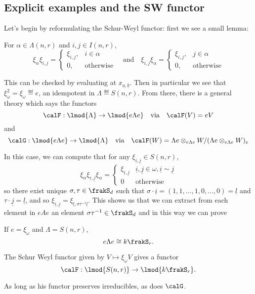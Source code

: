 \documentclass[12pt]{article}
\begin{document}
	\subsection{Explicit examples and the SW functor}
	Let's begin by reformulating the Schur-Weyl functor: first we see a small lemma:
	\begin{lem}
		For $\alpha\in\Lambda(n,r)$ and $i,j\in I(n,r)$,
		\[\xi_\alpha\xi_{i,j}=\begin{cases}
			\xi_{i,j}, & i\in\alpha\\
			0, &\text{otherwise}
		\end{cases}\quad\text{and}\quad\xi_{i,j}\xi_\alpha=\begin{cases}
			\xi_{i,j}, & j\in\alpha\\
			0, &\text{otherwise}
		\end{cases}\]
	\end{lem}
	This can be checked by evaluating at $x_{\underline a,\underline b}$. Then in particular we see that $\xi_\omega^2=\xi_\omega\eqdef e$,
	an idempotent in $\Lambda\eqdef S(n,r)$. From there, there is a general theory which says the functors 
	\[\calF:\lmod{\Lambda}\to \lmod{e\Lambda e}\quad\text{via}\quad \calF(V)=eV\]
	and 
	\[\calG:\lmod{e\Lambda e}\to \lmod{\Lambda}\quad\text{via}\quad \calF(W)=\Lambda e\otimes_{e\Lambda e}W/(\Lambda e\otimes_{e\Lambda e}W)_e\]

	In this case, we can compute that for any $\xi_{\underline i,\underline j}\in S(n,r)$,
	\[\xi_\alpha\xi_{\underline i,\underline j}\xi_\alpha=\begin{cases}
		\xi_{\underline i,\underline j}& \underline i,\underline j\in \omega,\underline i\sim \underline j\\
		0 & \text{otherwise}
	\end{cases}\]
	so there exist unique $\sigma,\tau\in\frakS_d$ such that $\sigma\cdot\underline i=(1,1,\dots,1,0,\dots,0)=\underline l$ and $\tau\cdot\underline j=\underline l$,
	and so $\xi_{\underline i,\underline j}=\xi_{\underline l,\sigma\tau^{-1}\underline l}$.
	This shows us that we can extract from each element in $eAe$ an element $\sigma\tau^{-1}\in\frakS_d$ and in this way 
	we can prove 
	\begin{lem}
		If $e=\xi_\omega$ and $\Lambda=S(n,r)$,
		\[e\Lambda e\cong k\frakS_r.\]
	\end{lem}
	\begin{cor}
		The Schur Weyl functor given by $V\mapsto \xi_\omega V$ gives a functor 
		\[\calF:\lmod{S(n,r)}\to \lmod{k\frakS_r}.\]
	\end{cor}
	\begin{rmk}
		As long as his functor preserves irreducibles, as does $\calG$.
	\end{rmk}
\end{document}
